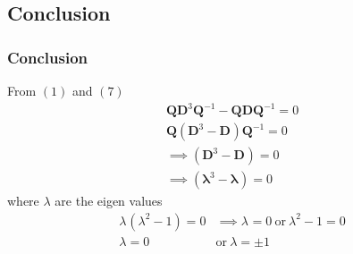 \documentclass{beamer}
\providecommand{\brak}[1]{\ensuremath{\left(#1\right)}}
\theoremstyle{remark}
\let\vec\mathbf
\numberwithin{equation}{section}
\begin{document}
\subsection{Conclusion}
\begin{frame}
\frametitle{Conclusion}
 From \brak{1} and \brak{7}
      \begin{align}
   \vec{Q}\vec{D}^{3}\vec{Q}^{-1}-\vec{Q}\vec{D}\vec{Q}^{-1}=0 \\
   \vec{Q}\brak{\vec{D}^{3}-\vec{D}^{}}\vec{Q}^{-1}=0 \\
   \implies \brak{\vec{D}^{3}-\vec{D}^{}}=0\\
   \implies \brak{\vec{\lambda}^{3}-\vec{\lambda}^{}}=0 
\end{align}
where $\lambda$ are the eigen values
\begin{align}
    \lambda^{}\brak{\lambda^2-1}=0&\implies
    \lambda^{}=0\ \text{or}\ \lambda^{2}-1=0 \\
     \lambda=0\ &\text{or}\ \lambda=\pm1
\end{align}
 \end{frame}
\end{document}
